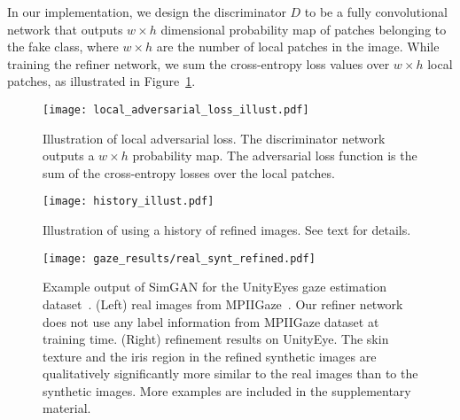 \documentclass[10pt,twocolumn,letterpaper]{article}
\begin{document}
In our implementation, we design the discriminator $D$ to be a fully convolutional network that outputs $w \times h $ dimensional probability map of patches belonging to the fake class, where $w \times h$ are the number of local patches in the image. While training the refiner network, we sum the cross-entropy loss values over  $w \times h$ local patches, as illustrated in Figure~\ref{fig:local_adversarial_loss_illust}. 




\begin{figure}[t]
\vspace{-0.2cm}
\centering
\texttt{[image: local\_adversarial\_loss\_illust.pdf]} \\
\caption{Illustration of local adversarial loss. 
The discriminator network outputs a $w \times h$ probability map.
The adversarial loss function is the sum of the cross-entropy losses over the local patches.  
}
\label{fig:local_adversarial_loss_illust}
\end{figure}


\begin{figure}[t]
\centering
\texttt{[image: history\_illust.pdf]} \\
\caption{Illustration of using a history of refined images. See text for details.
}
\label{fig:history_illust}
\end{figure}



\begin{figure*}[t]
\centering
\texttt{[image: gaze\_results/real\_synt\_refined.pdf]} 
\caption{Example output of SimGAN for the UnityEyes gaze estimation dataset~\cite{Wood16}. 
(Left) real images from MPIIGaze~\cite{Zhang15a}. 
Our refiner network does not use any label information from MPIIGaze dataset at training time. 
(Right) refinement results on UnityEye. 
The skin texture and the iris region in the refined synthetic images are qualitatively significantly more similar to the real images than to the synthetic images.
More examples are included in the supplementary material.
}
\label{fig:results_qualitative_gaze}
\vspace{-0.2cm}
\end{figure*}
\end{document}
